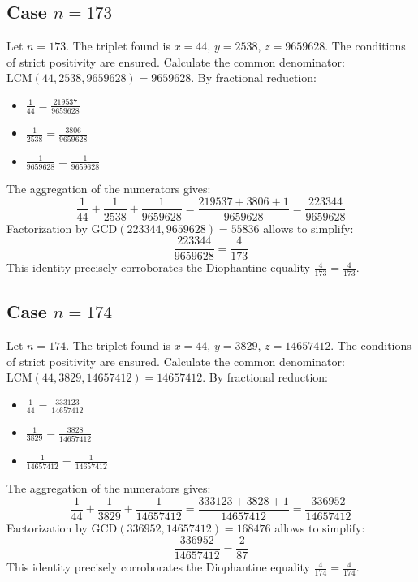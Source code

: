 \documentclass[11pt,a4paper]{article}
\begin{document}
\subsection{Case $n = 173$}
Let $n = 173$. The triplet found is $x = 44$, $y = 2538$, $z = 9659628$.
The conditions of strict positivity are ensured.
Calculate the common denominator: $\text{LCM}(44, 2538, 9659628) = 9659628$.
By fractional reduction:
\begin{itemize}
    \item $\frac{1}{44} = \frac{219537}{9659628}$
    \item $\frac{1}{2538} = \frac{3806}{9659628}$
    \item $\frac{1}{9659628} = \frac{1}{9659628}$
\end{itemize}
The aggregation of the numerators gives:
$$ \frac{1}{44} + \frac{1}{2538} + \frac{1}{9659628} = \frac{219537 + 3806 + 1}{9659628} = \frac{223344}{9659628} $$
Factorization by $\text{GCD}(223344, 9659628) = 55836$ allows to simplify:
$$ \frac{223344}{9659628} = \frac{4}{173} $$
This identity precisely corroborates the Diophantine equality $\frac{4}{173} = \frac{4}{173}$.

\subsection{Case $n = 174$}
Let $n = 174$. The triplet found is $x = 44$, $y = 3829$, $z = 14657412$.
The conditions of strict positivity are ensured.
Calculate the common denominator: $\text{LCM}(44, 3829, 14657412) = 14657412$.
By fractional reduction:
\begin{itemize}
    \item $\frac{1}{44} = \frac{333123}{14657412}$
    \item $\frac{1}{3829} = \frac{3828}{14657412}$
    \item $\frac{1}{14657412} = \frac{1}{14657412}$
\end{itemize}
The aggregation of the numerators gives:
$$ \frac{1}{44} + \frac{1}{3829} + \frac{1}{14657412} = \frac{333123 + 3828 + 1}{14657412} = \frac{336952}{14657412} $$
Factorization by $\text{GCD}(336952, 14657412) = 168476$ allows to simplify:
$$ \frac{336952}{14657412} = \frac{2}{87} $$
This identity precisely corroborates the Diophantine equality $\frac{4}{174} = \frac{4}{174}$.
\end{document}
